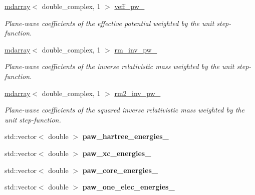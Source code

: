 \begin{DoxyCompactItemize}
\item 
\hyperlink{classsddk_1_1mdarray}{mdarray}$<$ double\+\_\+complex, 1 $>$ \hyperlink{classsirius_1_1_potential_adf213a65c122ebe4ed46b02560174da8}{veff\+\_\+pw\+\_\+}
\begin{DoxyCompactList}\small\item\em Plane-\/wave coefficients of the effective potential weighted by the unit step-\/function. \end{DoxyCompactList}\item 
\hyperlink{classsddk_1_1mdarray}{mdarray}$<$ double\+\_\+complex, 1 $>$ \hyperlink{classsirius_1_1_potential_a681931c08f11ddea4b3709280d7b309d}{rm\+\_\+inv\+\_\+pw\+\_\+}
\begin{DoxyCompactList}\small\item\em Plane-\/wave coefficients of the inverse relativistic mass weighted by the unit step-\/function. \end{DoxyCompactList}\item 
\hyperlink{classsddk_1_1mdarray}{mdarray}$<$ double\+\_\+complex, 1 $>$ \hyperlink{classsirius_1_1_potential_a71c1a995bc68a97d48e004999cd2b8a0}{rm2\+\_\+inv\+\_\+pw\+\_\+}
\begin{DoxyCompactList}\small\item\em Plane-\/wave coefficients of the squared inverse relativistic mass weighted by the unit step-\/function. \end{DoxyCompactList}\item 
\hypertarget{classsirius_1_1_potential_a444caac8abc61a7b0c7b1cf1685ab67d}{}std\+::vector$<$ double $>$ {\bfseries paw\+\_\+hartree\+\_\+energies\+\_\+}\label{classsirius_1_1_potential_a444caac8abc61a7b0c7b1cf1685ab67d}

\item 
\hypertarget{classsirius_1_1_potential_acb48c608fe5fdc14b200ec50a21bca12}{}std\+::vector$<$ double $>$ {\bfseries paw\+\_\+xc\+\_\+energies\+\_\+}\label{classsirius_1_1_potential_acb48c608fe5fdc14b200ec50a21bca12}

\item 
\hypertarget{classsirius_1_1_potential_a4fa98d38946a062e90e717375fa5a66a}{}std\+::vector$<$ double $>$ {\bfseries paw\+\_\+core\+\_\+energies\+\_\+}\label{classsirius_1_1_potential_a4fa98d38946a062e90e717375fa5a66a}

\item 
\hypertarget{classsirius_1_1_potential_a543259d27f0e07764ce7347c7adf3018}{}std\+::vector$<$ double $>$ {\bfseries paw\+\_\+one\+\_\+elec\+\_\+energies\+\_\+}\label{classsirius_1_1_potential_a543259d27f0e07764ce7347c7adf3018}


\end{DoxyCompactItemize}
